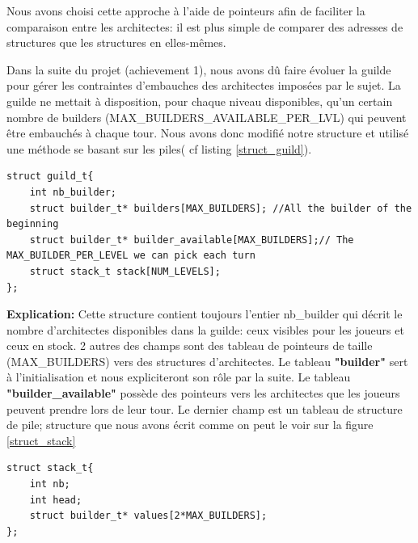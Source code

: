 \documentclass{article}
\begin{document}
        Nous avons choisi cette approche à l'aide de pointeurs afin de faciliter la comparaison entre les architectes: il est plus simple de comparer des adresses de structures que les structures en elles-mêmes.
    
        \vspace{1em} Dans la suite du projet (achievement 1), nous avons dû faire évoluer la guilde pour gérer les contraintes d'embauches des architectes imposées par le sujet. La guilde ne mettait à disposition, pour chaque niveau disponibles, qu'un certain nombre de builders (MAX\_BUILDERS\_AVAILABLE\_PER\_LVL) qui peuvent être embauchés à chaque tour. Nous avons donc modifié notre structure et utilisé une méthode se basant sur les piles( cf listing \ref{struct_guild}). 
        
        \vspace{1em}
        
         \begin{lstlisting}[frame=single, caption={Code de la structure de la guild pour de l'achievement 1},label=struct_guild]
struct guild_t{
    int nb_builder;
    struct builder_t* builders[MAX_BUILDERS]; //All the builder of the beginning
    struct builder_t* builder_available[MAX_BUILDERS];// The MAX_BUILDER_PER_LEVEL we can pick each turn
    struct stack_t stack[NUM_LEVELS];
};

    \end{lstlisting}
        \vspace{1em}

        \textbf{Explication:} Cette structure contient toujours l'entier nb\_builder qui décrit le nombre d'architectes disponibles dans la guilde: ceux visibles pour les joueurs et ceux en stock. 
        2 autres des champs sont des tableau de pointeurs de taille (MAX\_BUILDERS) vers des structures d'architectes. Le tableau \textbf{"builder"} sert à l'initialisation et nous expliciteront son rôle par la suite. Le tableau \textbf{"builder\_available"} possède des pointeurs vers les architectes que les joueurs peuvent prendre lors de leur tour.
        Le dernier champ est un tableau de structure de pile; structure que nous avons écrit comme on peut le voir sur la figure \ref{struct_stack}
        
        \vspace{1cm}

        \begin{lstlisting}[frame=single, caption={Code de la structure "stack\_t"},label={struct_stack}]
struct stack_t{
    int nb;
    int head;
    struct builder_t* values[2*MAX_BUILDERS];
};

    \end{lstlisting}
\end{document}

